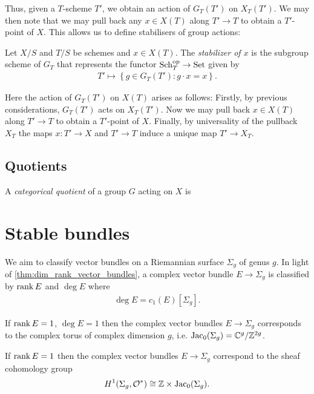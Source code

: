 \documentclass{article}
\begin{document}
Thus, given a $T$-scheme $T'$, we obtain an action of
$G_T(T')$ on $X_T(T')$. We may then note that we may pull back
any $x\in X(T)$ along $T'\to T$ to obtain a $T'$-point of $X$.
This allows us to define stabilisers of group actions:

\begin{definition}
  Let $X/S$ and $T/S$ be schemes and $x\in X(T)$. The
  \emph{stabilizer of $x$} is the subgroup scheme of $G_T$
  that represents the functor ${\operatorname{Sch}}^\text{op}_T \to \operatorname{Set}$ given by 
  \begin{align*}
    T' \mapsto \left\lbrace{ g \in G_T(T') : g\cdot x = x}\right\rbrace.
  \end{align*}
\end{definition}

Here the action of $G_T(T')$ on $X(T)$ arises as follows:
Firstly, by previous considerations, $G_T(T')$ acts on $X_T(T')$.
Now we may pull back $x\in X(T)$ along $T'\to T$ to obtain a
$T'$-point of $X$. Finally, by universality of the pullback
$X_T$ the maps $x:T'\to X$ and $T'\to T$ induce a unique map
$T'\to X_T$.

\subsection{Quotients}

\begin{definition}
  A \emph{categorical quotient} of a group $G$ acting on $X$
  is
\end{definition}

\section{Stable bundles}

We aim to classify vector bundles on a Riemannian surface $\Sigma_g$
of genus $g$. In light of \ref{thm:dim_rank_vector_bundles},
a complex vector bundle $E\to\Sigma_g$ is classified by
$\operatorname{rank} E$ and $\deg E$ where 
\begin{align*}
  \deg E = c_1(E)[\Sigma_g].
\end{align*}

If $\operatorname{rank} E = 1$, $\deg E = 1$ then the complex vector bundles
$E\to\Sigma_g$ corresponds to the complex torus of complex dimension
$g$, i.e. $\operatorname{Jac}_0(\Sigma_g)=\mathbb{C}^g / \mathbb{Z}^{2g}$.

If $\operatorname{rank} E = 1$ then the complex vector bundles $E\to\Sigma_g$
correspond to the sheaf cohomology  group
\begin{align*}
  H^1(\Sigma_g,\mathcal O^*) \cong \mathbb{Z}\times\operatorname{Jac}_0(\Sigma_g).
\end{align*}
\end{document}
